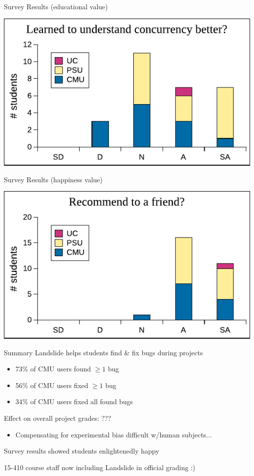 \documentclass[xcolor=dvipsnames]{beamer}
\begin{document}
\begin{frame}{Survey Results (educational value)}
	\begin{center}
		\includegraphics[width=\textwidth]{../survey8.pdf} %
	\end{center}
\end{frame}

\begin{frame}{Survey Results (happiness value)}
	\begin{center}
		\includegraphics[width=\textwidth]{../survey10.pdf} %
	\end{center}
\end{frame}

\begin{frame}{Summary}
	Landslide helps students find \& fix bugs during projects
	\begin{itemize}
		\item 73\% of CMU users found $\ge 1$ bug
		\item 56\% of CMU users fixed $\ge 1$ bug
		\item 34\% of CMU users fixed all found bugs
	\end{itemize}
	\linegap

	Effect on overall project grades: ???
	\begin{itemize}
		\item Compensating for experimental bias difficult w/human subjects...
	\end{itemize}
	\linegap

	Survey results showed students enlightenedly happy
	\linegap

	15-410 course staff now including Landslide in official grading :)
\end{frame}
\end{document}

